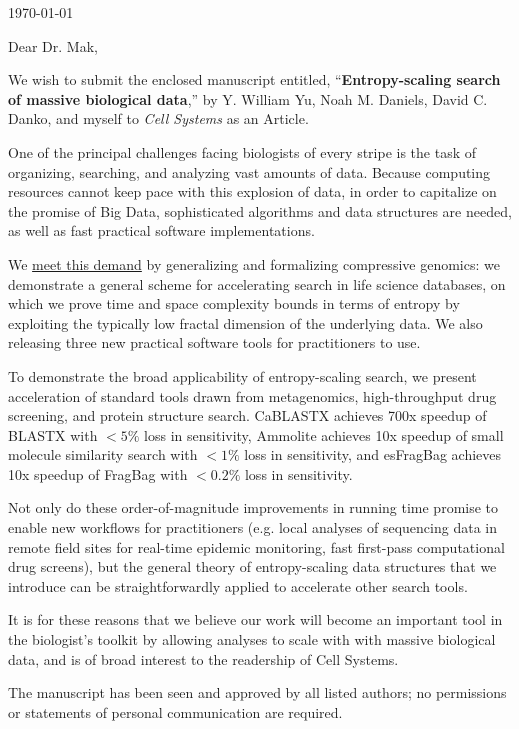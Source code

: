 \documentclass{article}
\begin{document}
\hspace*{0.5\linewidth}

\today

\bigskip

Dear Dr. Mak,

We wish to submit the enclosed manuscript entitled,
``\textbf{Entropy-scaling search of massive biological data},''
by Y. William Yu, Noah M. Daniels, David C. Danko, and myself
to \textit{Cell Systems} as an Article.

One of the principal challenges facing biologists of every stripe is the task 
of organizing, searching, and analyzing vast amounts of data.
Because computing resources cannot keep pace with this explosion of data, in order to capitalize on the promise of Big Data, sophisticated algorithms and data structures are needed, as well as fast practical software implementations.

We \underline{meet this demand} by generalizing and formalizing compressive 
genomics: we demonstrate a general scheme for accelerating search in life science databases, on which we prove time and space complexity bounds in terms 
of entropy by exploiting the typically low fractal dimension of the underlying 
data. 
We also releasing three new practical software tools for practitioners to use.
 
To demonstrate the broad applicability of entropy-scaling search, we present acceleration of standard tools drawn from metagenomics, high-throughput drug screening, and protein structure search.
CaBLASTX achieves 700x speedup of BLASTX with $<5\%$ loss in sensitivity, Ammolite achieves 10x speedup of small molecule similarity search with $<1\%$ 
loss in sensitivity, and esFragBag achieves 10x speedup of FragBag with $<0.2\%$ loss in sensitivity.

Not only do these order-of-magnitude improvements in running time promise to enable new workflows for practitioners (e.g. local analyses of sequencing data in remote field sites for real-time epidemic monitoring, fast first-pass computational drug screens), but the general theory of entropy-scaling data structures that we introduce can be straightforwardly applied to accelerate other search tools.

It is for these reasons that we believe our work will become an important tool in the biologist's toolkit by allowing analyses to scale with with massive biological data, and is of broad interest to the readership of Cell Systems.

The manuscript has been seen and approved by all listed authors; no permissions or statements of personal communication are required.
\end{document}
